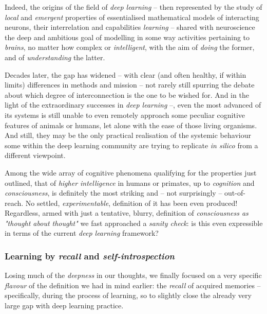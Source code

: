 Indeed, the origins of the field of \textit{deep learning} -- then represented by the study of \textit{local} and \textit{emergent} properties of essentialised mathematical models of interacting neurons, their interrelation and capabilities \wrt \textit{learning} -- shared with neuroscience the deep and ambitious goal of modelling in some way activities pertaining to \textit{brains}, no matter how complex or \textit{intelligent}, with the aim of \textit{doing} the former, and of \textit{understanding} the latter.

Decades later, the gap has widened -- with clear (and often healthy, if within limits) differences in methods and mission -- not rarely still spurring the debate about which degree of interconnection is the one to be wished for. And in the light of the extraordinary successes in \textit{deep learning} --, even the most advanced of its systems is still unable to even remotely approach some peculiar cognitive features of animals or humans, let alone with the ease of those living organisms. And still, they may be the only practical realisation of the systemic behaviour some within the deep learning community are trying to replicate \textit{in silico} from a different viewpoint.

Among the wide array of cognitive phenomena qualifying for the properties just outlined, that of \textit{higher intelligence} in humans or primates, up to \textit{cognition} and \textit{consciousness}, is definitely the most striking and -- not surprisingly -- out-of-reach. No settled, \textit{experimentable}, definition of it has been even produced! Regardless, armed with just a tentative, blurry, definition of \textit{consciousness as "thought about thought"} we fast approached a \textit{sanity check}: is this even expressible in terms of the current \textit{deep learning} framework?

\subsubsection{Learning by \textit{recall} and \textit{self-introspection}}
Losing much of the \textit{deepness} in our thoughts, we finally focused on a very specific \textit{flavour} of the definition we had in mind earlier: the \textit{recall} of acquired memories -- specifically, during the process of learning, so to slightly close the already very large gap with deep learning practice.

